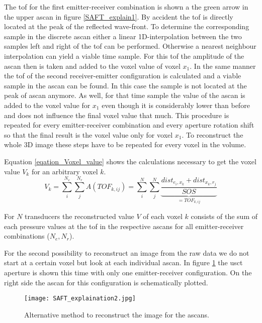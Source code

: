 The \ac{tof} for the first emitter-receiver combination is shown a the green arrow in the upper \ac{ascan} in figure \ref{SAFT_explain1}. By accident the \ac{tof} is directly located at the peak of the reflected wave-front. To determine the corresponding sample in the discrete \ac{ascan} either a linear 1D-interpolation between the two samples left and right of the \ac{tof} can be performed. Otherwise a nearest neighbour interpolation can yield a viable time sample.
For this \ac{tof} the amplitude of the \ac{ascan} then is taken and added to the voxel value of voxel $x_1$. 
In the same manner the \ac{tof} of the second receiver-emitter configuration is calculated and a viable sample in the \ac{ascan} can be found. In this case the sample is not located at the peak of \ac{ascan} anymore. As well, for that time sample the value of the \ac{ascan} is added to the voxel value for $x_1$ even though it is considerably lower than before and does not influence the final voxel value that much. 
This procedure is repeated for every emitter-receiver combination and every aperture rotation shift so that the final result is the voxel value only for voxel $x_1$.
To reconstruct the whole 3D image these steps have to be repeated for every voxel in the volume.

Equation \ref{eqation_Voxel_value} shows the calculations necessary to get the voxel value $V_k$ for an arbitrary voxel $k$. 
\begin{equation}
V_k = \sum_{i}^{N_e}\sum_{j}^{N_r} A(TOF_{k,ij}) = \sum_{i}^{N}\sum_{j}^{N} \underset{ = TOF_{k,ij} } {\underbrace{\frac{ dist_{e_i,x_k} + dist_{x_k,r_{j}}}{SOS} }}
\label{eqation_Voxel_value}
\end{equation}

For $N$ transducers the reconstructed value $V$ of each voxel $k$ consists of the sum of each pressure values at the \ac{tof} in the respective \acp{ascan} for all emitter-receiver combinations ($N_e, N_r$). 

\bigskip

For the second possibility to reconstruct an image from the raw data we do not start at a certain voxel but look at each individual \ac{ascan}. In figure \ref{SAFT_explain2} the \ac{usct} aperture is shown this time with only one emitter-receiver configuration. On the right side the \ac{ascan} for this configuration is schematically plotted.

\begin{figure}[H]
    \centering
    \texttt{[image: SAFT\_explaination2.jpg]}
    \caption{ Alternative method to reconstruct the image for the \acp{ascan}. }
    \label{SAFT_explain2}
\end{figure}


